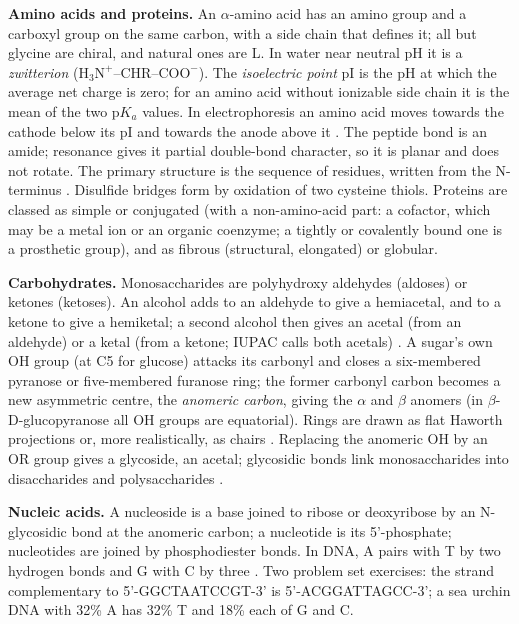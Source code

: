 \textbf{Amino acids and proteins.}
An $\alpha$-amino acid has an amino group and
a carboxyl group on the same carbon, with a
side chain that defines it; all but glycine
are chiral, and natural ones are L. In water
near neutral pH it is a \emph{zwitterion}
($\mathrm{H_3N^+}$--CHR--$\mathrm{COO^-}$).
The \emph{isoelectric point} pI is the pH at
which the average net charge is zero; for an
amino acid without ionizable side chain it is
the mean of the two $\mathrm{p}K_a$ values.
In electrophoresis an amino acid moves
towards the cathode below its pI and towards
the anode above it \cite[Sections 24-2 to
24-4]{wade2013organic}. The peptide bond is
an amide; resonance gives it partial
double-bond character, so it is planar and
does not rotate. The primary structure is the
sequence of residues, written from the
N-terminus \cite[Section
24-8]{wade2013organic}. Disulfide bridges
form by oxidation of two cysteine thiols.
Proteins are classed as simple or conjugated
(with a non-amino-acid part: a cofactor,
which may be a metal ion or an organic
coenzyme; a tightly or covalently bound one
is a prosthetic group), and as fibrous
(structural, elongated) or globular.

\textbf{Carbohydrates.}
Monosaccharides are polyhydroxy aldehydes
(aldoses) or ketones (ketoses). An alcohol
adds to an aldehyde to give a hemiacetal, and
to a ketone to give a hemiketal; a second
alcohol then gives an acetal (from an
aldehyde) or a ketal (from a ketone; IUPAC
calls both acetals) \cite[Section
18-17]{wade2013organic}. A sugar's own OH
group (at C5 for glucose) attacks its
carbonyl and closes a six-membered pyranose
or five-membered furanose ring; the former
carbonyl carbon becomes a new asymmetric
centre, the \emph{anomeric carbon}, giving
the $\alpha$ and $\beta$ anomers (in
$\beta$-D-glucopyranose all OH groups are
equatorial). Rings are drawn as flat Haworth
projections or, more realistically, as chairs
\cite[Sections 23-6 and
23-7]{wade2013organic}. Replacing the
anomeric OH by an OR group gives a glycoside,
an acetal; glycosidic bonds link
monosaccharides into disaccharides and
polysaccharides \cite[Section
23-11]{wade2013organic}.

\textbf{Nucleic acids.}
A nucleoside is a base joined to ribose or
deoxyribose by an N-glycosidic bond at the
anomeric carbon; a nucleotide is its
5'-phosphate; nucleotides are joined by
phosphodiester bonds. In DNA, A pairs with T
by two hydrogen bonds and G with C by three
\cite[Sections 23-19 to
23-21]{wade2013organic}. Two problem set
exercises: the strand complementary to
5'-GGCTAATCCGT-3' is 5'-ACGGATTAGCC-3'; a sea
urchin DNA with 32\% A has 32\% T and 18\%
each of G and C.

